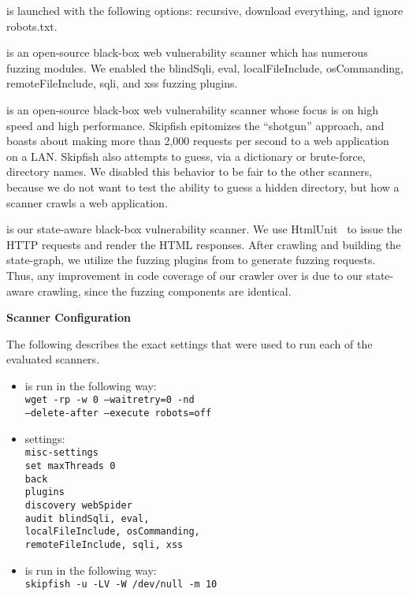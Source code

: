 \wget{} is launched with the following options: recursive, download everything, and
ignore robots.txt. 

\noindent \textbf{\waf{}} is an open-source black-box web vulnerability
scanner which has numerous fuzzing modules. We enabled the blindSqli, eval,
localFileInclude, osCommanding, remoteFileInclude, sqli, and xss fuzzing plugins.

\noindent \textbf{\skipfish{}} is an open-source black-box web vulnerability
scanner whose focus is on high speed and high performance. Skipfish epitomizes
the ``shotgun'' approach, and boasts about making more than 2,000 requests per
second to a web application on a LAN. Skipfish also attempts to guess, via a
dictionary or brute-force, directory names. We disabled this behavior
to be fair to the other scanners, because we do not want to test the ability to
guess a hidden directory, but how a scanner crawls a web
application.

\noindent \textbf{\crawler{}} is our state-aware black-box vulnerability
scanner. We use HtmlUnit~\cite{htmlunit} to issue the HTTP requests and render
the HTML responses. After crawling and building the state-graph, we utilize the
fuzzing plugins from \waf{} to generate fuzzing requests. Thus, any improvement
in code coverage of our crawler over \waf{} is due to our state-aware crawling,
since the fuzzing components are identical.


\noindent \textbf{Scanner Configuration}

The following describes the exact settings that were used to run each of the
evaluated scanners.

\begin{itemize}
\item \wget{} is run in the following way: \\
\texttt{wget -rp -w 0 --waitretry=0 -nd \\
\phantom{MM}--delete-after  --execute robots=off}

\item \waf{} settings: \\
\texttt{misc-settings  \\
set maxThreads 0 \\
back \\
plugins \\
discovery webSpider \\
audit blindSqli, eval, \\
\phantom{MM}localFileInclude, osCommanding, \\
\phantom{MM}remoteFileInclude, sqli, xss 
}

\item \skipfish{} is run in the following way: \\
\texttt{skipfish -u -LV -W /dev/null -m 10}
\end{itemize}

